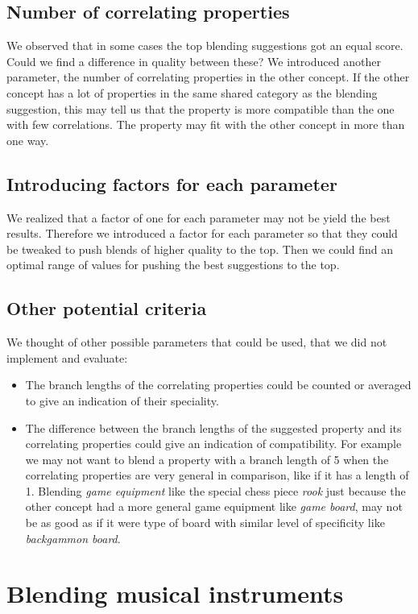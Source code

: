 \subsection{Number of correlating properties}
We observed that in some cases the top blending suggestions got an equal score. Could we find a difference in quality between these? We introduced another parameter, the number of correlating properties in the other concept. If the other concept has a lot of properties in the same shared category as the blending suggestion, this may tell us that the property is more compatible than the one with few correlations. The property may fit with the other concept in more than one way.

\subsection{Introducing factors for each parameter}
We realized that a factor of one for each parameter may not be yield the best results. Therefore we introduced a factor for each parameter so that they could be tweaked to push blends of higher quality to the top. Then we could find an optimal range of values for pushing the best suggestions to the top.

\subsection{Other potential criteria}
We thought of other possible parameters that could be used, that we did not implement and evaluate:
\begin{itemize}
\item The branch lengths of the correlating properties could be counted or averaged to give an indication of their speciality.
\item The difference between the branch lengths of the suggested property and its correlating properties could give an indication of compatibility. For example we may not want to blend a property with a branch length of 5 when the correlating properties are very general in comparison, like if it has a length of 1. Blending \emph{game equipment} like the special chess piece \emph{rook} just because the other concept had a more general game equipment like \emph{game board}, may not be as good as if it were type of board with similar level of specificity like \emph{backgammon board}.
\end{itemize}

\section{Blending musical instruments}

